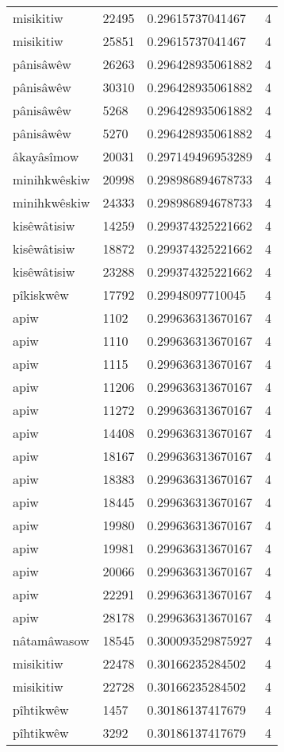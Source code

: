\begin{longtable}{llll}
misikitiw & 22495 & 0.29615737041467 & 4 \\
misikitiw & 25851 & 0.29615737041467 & 4 \\
pânisâwêw & 26263 & 0.296428935061882 & 4 \\
pânisâwêw & 30310 & 0.296428935061882 & 4 \\
pânisâwêw & 5268 & 0.296428935061882 & 4 \\
pânisâwêw & 5270 & 0.296428935061882 & 4 \\
âkayâsîmow & 20031 & 0.297149496953289 & 4 \\
minihkwêskiw & 20998 & 0.298986894678733 & 4 \\
minihkwêskiw & 24333 & 0.298986894678733 & 4 \\
kisêwâtisiw & 14259 & 0.299374325221662 & 4 \\
kisêwâtisiw & 18872 & 0.299374325221662 & 4 \\
kisêwâtisiw & 23288 & 0.299374325221662 & 4 \\
pîkiskwêw & 17792 & 0.29948097710045 & 4 \\
apiw & 1102 & 0.299636313670167 & 4 \\
apiw & 1110 & 0.299636313670167 & 4 \\
apiw & 1115 & 0.299636313670167 & 4 \\
apiw & 11206 & 0.299636313670167 & 4 \\
apiw & 11272 & 0.299636313670167 & 4 \\
apiw & 14408 & 0.299636313670167 & 4 \\
apiw & 18167 & 0.299636313670167 & 4 \\
apiw & 18383 & 0.299636313670167 & 4 \\
apiw & 18445 & 0.299636313670167 & 4 \\
apiw & 19980 & 0.299636313670167 & 4 \\
apiw & 19981 & 0.299636313670167 & 4 \\
apiw & 20066 & 0.299636313670167 & 4 \\
apiw & 22291 & 0.299636313670167 & 4 \\
apiw & 28178 & 0.299636313670167 & 4 \\
nâtamâwasow & 18545 & 0.300093529875927 & 4 \\
misikitiw & 22478 & 0.30166235284502 & 4 \\
misikitiw & 22728 & 0.30166235284502 & 4 \\
pîhtikwêw & 1457 & 0.30186137417679 & 4 \\
pîhtikwêw & 3292 & 0.30186137417679 & 4 \\

\end{longtable}
